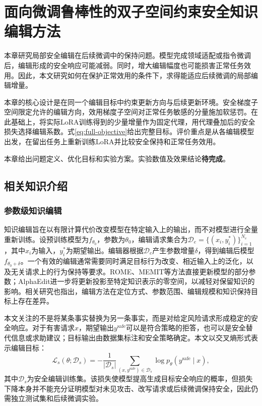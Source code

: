 \chapter{面向微调鲁棒性的双子空间约束安全知识编辑方法}\label{chap:method}

本章研究局部安全编辑在后续微调中的保持问题。模型完成领域适配或指令微调后，编辑形成的安全响应可能减弱。同时，增大编辑幅度也可能损害正常任务效用。因此，本文研究如何在保护正常效用的条件下，求得能适应后续微调的局部编辑增量。

本章的核心设计是在同一个编辑目标中约束更新方向与后续更新环境。安全梯度子空间限定允许的编辑方向，效用梯度子空间对正常任务敏感的分量施加软惩罚。在此基础上，将实际LoRA训练得到的少量增量作为固定代理，用代理叠加后的安全损失选择编辑系数。式\eqref{eq:full-objective}给出完整目标。评价重点是从各编辑模型出发，在留出任务上重新训练LoRA并比较安全保持和正常任务效用。

本章给出问题定义、优化目标和实验方案。实验数值及效果结论\textbf{待完成}。

\section{相关知识介绍}

\subsection{参数级知识编辑}

知识编辑旨在以有限计算代价改变模型在特定输入上的输出，而不对模型进行全量重新训练。设预训练模型为$f_{\theta_0}$，参数为$\theta_0$，编辑请求集合为$\mathcal{D}_e=\{(x_i,y_i^*)\}_{i=1}^{N_e}$，其中$x_i$为输入，$y_i^*$为期望输出。编辑器根据$\mathcal{D}_e$产生参数增量$\delta$，得到编辑后模型$f_{\theta_0+\delta}$。一个有效的编辑通常需要同时满足目标行为改变、相近输入上的泛化，以及无关请求上的行为保持等要求。ROME、MEMIT等方法直接更新模型的部分参数；AlphaEdit进一步将更新投影至特定知识表示的零空间，以减轻对保留知识的影响\cite{meng2022rome,meng2023memit,fang2024alphaedit}。相关研究也指出，编辑方法在定位方式、参数范围、编辑规模和知识保持目标上存在差异\cite{zhang2024comprehensive,wang2024survey}。

本文关注的不是将某条事实替换为另一条事实，而是对给定风险请求形成稳定的安全响应。对于有害请求$x$，期望输出$y^{\mathrm{safe}}$可以是符合策略的拒答，也可以是安全替代信息或求助建议；目标输出由数据集标注和安全策略确定。本文以交叉熵形式表示编辑目标：
\begin{equation}
  \mathcal{L}_{s}(\theta;\mathcal{D}_{s})
  =-\frac{1}{|\mathcal{D}_{s}|}
  \sum_{(x,y^{\mathrm{safe}})\in\mathcal{D}_{s}}
  \log p_{\theta}(y^{\mathrm{safe}}\mid x),
  \label{eq:safety-edit-loss}
\end{equation}
其中$\mathcal{D}_{s}$为安全编辑训练集。该损失使模型提高生成目标安全响应的概率，但损失下降本身并不能充分证明模型对未见攻击、改写请求或后续微调保持安全，因此仍需独立测试集和后续微调实验。

